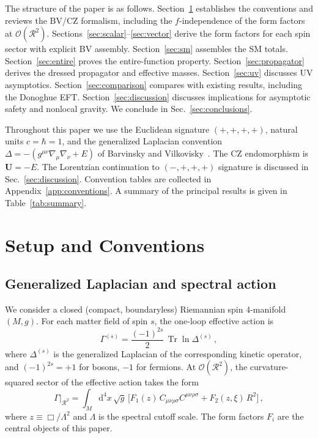 \documentclass[aps,prd,twocolumn,superscriptaddress,nofootinbib,floatfix]{revtex4-2}
\theoremstyle{definition}
\theoremstyle{remark}
\newcommand{\Weylsq}{C_{\mu\nu\rho\sigma}C^{\mu\nu\rho\sigma}}
\newcommand{\dd}{\mathrm{d}}
\newcommand{\Tr}{\operatorname{Tr}}
\begin{document}
The structure of the paper is as follows. Section~\ref{sec:setup} establishes
the conventions and reviews the BV/CZ formalism, including the
$f$-independence of the form factors at $\mathcal{O}(\mathcal{R}^2)$.
Sections~\ref{sec:scalar}--\ref{sec:vector} derive the form factors for each
spin sector with explicit BV assembly.
Section~\ref{sec:sm} assembles the SM totals.
Section~\ref{sec:entire} proves the entire-function property.
Section~\ref{sec:propagator} derives the dressed propagator and effective
masses. Section~\ref{sec:uv} discusses UV asymptotics.
Section~\ref{sec:comparison} compares with existing results, including the
Donoghue EFT. Section~\ref{sec:discussion} discusses implications for
asymptotic safety and nonlocal gravity. We conclude in
Sec.~\ref{sec:conclusions}.

Throughout this paper we use the Euclidean signature $(+,+,+,+)$, natural
units $c = \hbar = 1$, and the generalized Laplacian convention
$\Delta = -(g^{\mu\nu}\nabla_\mu\nabla_\nu + E)$ of Barvinsky and
Vilkovisky~\cite{Barvinsky:1985an}. The CZ endomorphism is
$\mathbf{U} = -E$. The Lorentzian continuation to $(-,+,+,+)$ signature is
discussed in Sec.~\ref{sec:discussion}. Convention tables are collected in
Appendix~\ref{app:conventions}. A summary of the principal results is given
in Table~\ref{tab:summary}.


\section{Setup and Conventions}
\label{sec:setup}

\subsection{Generalized Laplacian and spectral action}

We consider a closed (compact, boundaryless) Riemannian spin 4-manifold
$(M,g)$. For each matter field of spin $s$, the one-loop effective action is
\begin{equation}
  \Gamma^{(s)} = \frac{(-1)^{2s}}{2}\,\Tr\ln\Delta^{(s)}\,,
  \label{eq:one-loop}
\end{equation}
where $\Delta^{(s)}$ is the generalized Laplacian of the corresponding
kinetic operator, and $(-1)^{2s} = +1$ for bosons, $-1$ for fermions. At
$\mathcal{O}(\mathcal{R}^2)$, the curvature-squared sector of the effective
action takes the form
\begin{equation}
  \Gamma\Big|_{\mathcal{R}^2}
  = \int_M \dd^4x\,\sqrt{g}\,\bigl[
    F_1(z)\,\Weylsq + F_2(z,\xi)\,R^2
  \bigr]\,,
  \label{eq:spectral-action}
\end{equation}
where $z \equiv \Box/\Lambda^2$ and $\Lambda$ is the spectral cutoff scale.
The form factors $F_i$ are the central objects of this paper.
\end{document}
